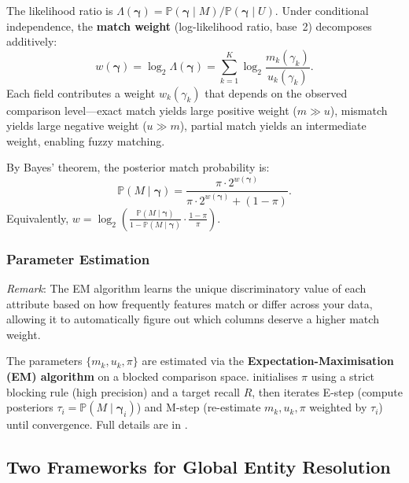 The likelihood ratio is $\Lambda(\boldsymbol{\gamma}) = \mathbb{P}(\boldsymbol{\gamma} \mid M) / \mathbb{P}(\boldsymbol{\gamma} \mid U)$. Under conditional independence, the \textbf{match weight} (log-likelihood ratio, base~2) decomposes additively:
\begin{equation}
	w(\boldsymbol{\gamma}) = \log_2 \Lambda(\boldsymbol{\gamma}) = \sum_{k=1}^K \log_2 \frac{m_k(\gamma_k)}{u_k(\gamma_k)} .
\end{equation}
Each field contributes a weight $w_k(\gamma_k)$ that depends on the observed comparison level—exact match yields large positive weight ($m \gg u$), mismatch yields large negative weight ($u \gg m$), partial match yields an intermediate weight, enabling fuzzy matching.

By Bayes' theorem, the posterior match probability is:
\begin{equation}
	\mathbb{P}(M \mid \boldsymbol{\gamma}) = \frac{\pi \cdot 2^{w(\boldsymbol{\gamma})}}{\pi \cdot 2^{w(\boldsymbol{\gamma})} + (1-\pi)} .
	\label{eq:posterior}
\end{equation}
Equivalently, $w = \log_2 \left( \frac{\mathbb{P}(M \mid \boldsymbol{\gamma})}{1 - \mathbb{P}(M \mid \boldsymbol{\gamma})} \cdot \frac{1-\pi}{\pi} \right)$.


\subsubsection{Parameter Estimation}
\textit{Remark}: The EM algorithm learns the unique discriminatory value of each attribute based on how frequently features match or differ across your data, allowing it to automatically figure out which columns deserve a higher match weight.

The parameters $\{m_k, u_k, \pi\}$ are estimated via the \textbf{Expectation-Maximisation (EM) algorithm} \cite{dempster1977maximum} on a blocked comparison space. \splink{} initialises $\pi$ using a strict blocking rule (high precision) and a target recall $R$, then iterates E-step (compute posteriors $\tau_i = \mathbb{P}(M \mid \boldsymbol{\gamma}_i)$) and M-step (re-estimate $m_k, u_k, \pi$ weighted by $\tau_i$) until convergence. Full details are in .

\subsection{Two Frameworks for Global Entity Resolution}
\label{sec:two_frameworks_overview}

